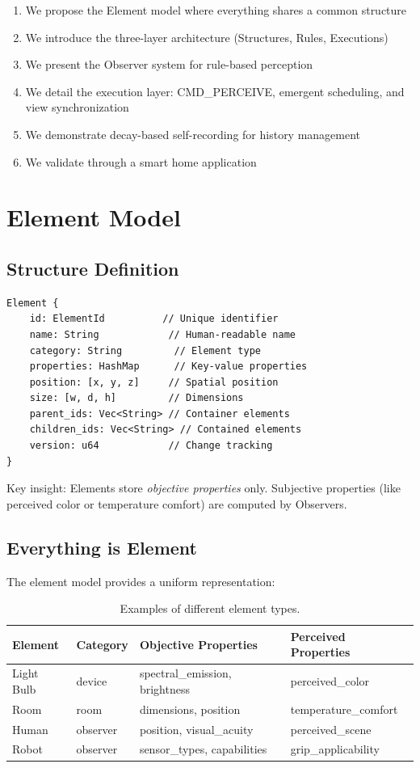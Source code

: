 \documentclass{article}
\begin{document}
\begin{enumerate}
\item We propose the Element model where everything shares a common structure
\item We introduce the three-layer architecture (Structures, Rules, Executions)
\item We present the Observer system for rule-based perception
\item We detail the execution layer: CMD\_PERCEIVE, emergent scheduling, and view synchronization
\item We demonstrate decay-based self-recording for history management
\item We validate through a smart home application
\end{enumerate}

\section{Element Model}

\subsection{Structure Definition}

\begin{verbatim}
Element {
    id: ElementId          // Unique identifier
    name: String            // Human-readable name
    category: String         // Element type
    properties: HashMap      // Key-value properties
    position: [x, y, z]     // Spatial position
    size: [w, d, h]         // Dimensions
    parent_ids: Vec<String> // Container elements
    children_ids: Vec<String> // Contained elements
    version: u64            // Change tracking
}
\end{verbatim}

Key insight: Elements store \emph{objective properties} only. Subjective properties (like perceived color or temperature comfort) are computed by Observers.

\subsection{Everything is Element}

The element model provides a uniform representation:

\begin{table}[h]
\centering
\caption{Examples of different element types.}
\label{tab:element_types}
\begin{tabular}{llll}
\toprule
\textbf{Element} & \textbf{Category} & \textbf{Objective Properties} & \textbf{Perceived Properties} \\
\midrule
Light Bulb & device & spectral\_emission, brightness & perceived\_color \\
Room & room & dimensions, position & temperature\_comfort \\
Human & observer & position, visual\_acuity & perceived\_scene \\
Robot & observer & sensor\_types, capabilities & grip\_applicability \\
\bottomrule
\end{tabular}
\end{table}
\end{document}
